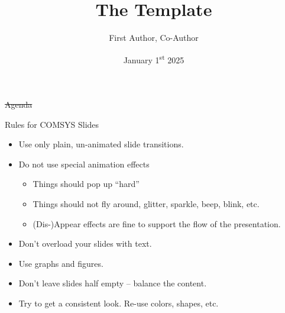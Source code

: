 \documentclass[english,aspectratio=169,t,9pt]{beamer}
\title{The Template}
\author[Name of presenter]{First Author, Co-Author}
\date{January 1\textsuperscript{st} 2025}
\begin{document}
\titleframe

\begin{frame}{\st{Agenda}}
	\vfill
	\vfill
	\vfill
\end{frame}

\begin{frame}{Rules for COMSYS Slides}
	\begin{itemize}
		\item Use only plain, un-animated slide transitions.
		\item Do not use special animation effects
			\begin{itemize}
				\item Things should pop up ``hard''
				\item Things should not fly around, glitter, sparkle, beep, blink, etc.
				\item (Dis-)Appear effects are fine to support the flow of the presentation.
			\end{itemize}
		\item Don't overload your slides with text.
		\item Use graphs and figures.
		\item Don't leave slides half empty -- balance the content.
		\item Try to get a consistent look. Re-use colors, shapes, etc.
	\end{itemize}
\end{frame}
\end{document}
